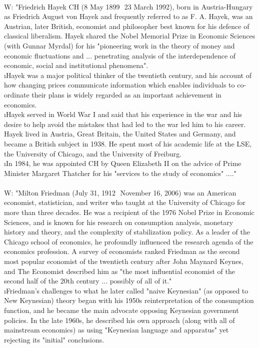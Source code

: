 \documentclass[12pt]{article}
\begin{document}
 \\
W: "Friedrich Hayek CH (8 May 1899  23 March 1992), born in Austria-Hungary as Friedrich August von Hayek and frequently referred to as F. A. Hayek, was an Austrian, later British, economist and philosopher best known for his defence of classical liberalism. Hayek shared the Nobel Memorial Prize in Economic Sciences (with Gunnar Myrdal) for his "pioneering work in the theory of money and economic fluctuations and ... penetrating analysis of the interdependence of economic, social and institutional phenomena". \\
\i Hayek was a major political thinker of the twentieth century, and his account of how changing prices communicate information which enables individuals to co-ordinate their plans is widely regarded as an important achievement in economics. \\
\i Hayek served in World War I and said that his experience in the war and his desire to help avoid the mistakes that had led to the war led him to his career. Hayek lived in Austria, Great Britain, the United States and Germany, and became a British subject in 1938. He spent most of his academic life at the LSE, the University of Chicago, and the University of Freiburg. \\
\i In 1984, he was appointed CH by Queen Elizabeth II on the advice of Prime Minister Margaret Thatcher for his "services to the study of economics" ...." \\
 \\
W: "Milton Friedman (July 31, 1912  November 16, 2006) was an American economist, statistician, and writer who taught at the University of Chicago for more than three decades. He was a recipient of the 1976 Nobel Prize in Economic Sciences, and is known for his research on consumption analysis, monetary history and theory, and the complexity of stabilization policy. As a leader of the Chicago school of economics, he profoundly influenced the research agenda of the economics profession. A survey of economists ranked Friedman as the second most popular economist of the twentieth century after John Maynard Keynes, and The Economist described him as "the most influential economist of the second half of the 20th century ... possibly of all of it." \\
\i Friedman's challenges to what he later called "naive Keynesian" (as opposed to New Keynesian) theory began with his 1950s reinterpretation of the consumption function, and he became the main advocate opposing Keynesian government policies. In the late 1960s, he described his own approach (along with all of mainstream economics) as using "Keynesian language and apparatus" yet rejecting its "initial" conclusions. \\
\end{document}
